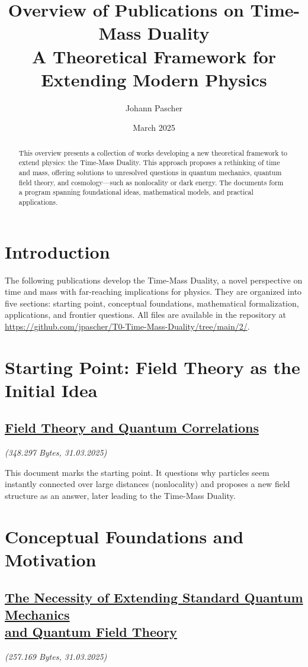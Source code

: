 \documentclass[a4paper,12pt]{article}
\title{Overview of Publications on Time-Mass Duality \\ \Large{A Theoretical Framework for Extending Modern Physics}}
\author{Johann Pascher}
\date{March 2025}
\newcommand{\repobase}{https://github.com/jpascher/T0-Time-Mass-Duality/tree/main/2/}
\begin{document}
	
	\maketitle
	
	\begin{abstract}
		This overview presents a collection of works developing a new theoretical framework to extend physics: the Time-Mass Duality. This approach proposes a rethinking of time and mass, offering solutions to unresolved questions in quantum mechanics, quantum field theory, and cosmology—such as nonlocality or dark energy. The documents form a program spanning foundational ideas, mathematical models, and practical applications.
	\end{abstract}
	
	\section{Introduction}
	The following publications develop the Time-Mass Duality, a novel perspective on time and mass with far-reaching implications for physics. They are organized into five sections: starting point, conceptual foundations, mathematical formalization, applications, and frontier questions. All files are available in the repository at \url{\repobase}.
	
	\section{Starting Point: Field Theory as the Initial Idea}
	
	\subsection{\small\href{\repobase/pdf/English/Feldtheorie und Quantenkorrelationen_en.pdf}{Field Theory and Quantum Correlations}}
	\textit{(348.297 Bytes, 31.03.2025)}
	
	This document marks the starting point. It questions why particles seem instantly connected over large distances (nonlocality) and proposes a new field structure as an answer, later leading to the Time-Mass Duality.
	
	\section{Conceptual Foundations and Motivation}
	
	\subsection{\small\href{\repobase/pdf/English/Die Notwendigkeit einer Erweiterung der Standard-Quantenmechanik und Quantenfeldtheorie_en.pdf}{The Necessity of Extending Standard Quantum Mechanics \\ and Quantum Field Theory}}
	\textit{(257.169 Bytes, 31.03.2025)}
	
\end{document}
